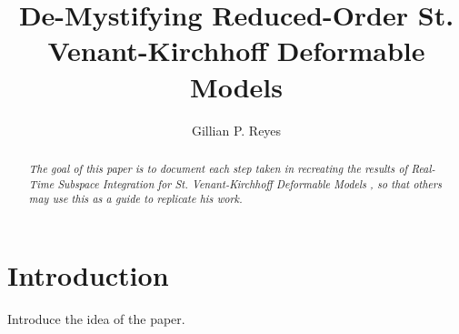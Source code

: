 \documentclass[twocolumn,10pt]{asme2ej}
\title{De-Mystifying Reduced-Order St. Venant-Kirchhoff Deformable Models}
\author{Gillian P. Reyes
}
\begin{document}
\maketitle

\begin{abstract}
{\it The goal of this paper is to document each step taken in recreating
the results of Real-Time Subspace Integration for St. Venant-Kirchhoff Deformable Models \cite{barbic}, so that
others may use this as a guide to replicate his work.
}
\end{abstract}

%

\section{Introduction}

Introduce the idea of the paper.
\end{document}
